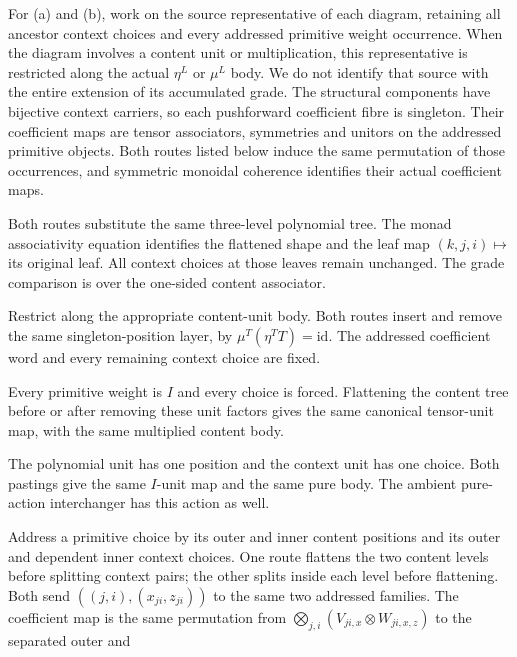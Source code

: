 \documentclass[11pt,a4paper]{article}
\theoremstyle{definition}
\newcommand{\id}{\mathrm{id}}
\begin{document}
For (a) and (b), work on the source representative of each diagram, retaining
all ancestor context choices and every addressed primitive weight occurrence.
When the diagram involves a content unit or multiplication, this representative
is restricted along the actual $\eta^L$ or $\mu^L$ body. We do not identify
that source with the entire extension of its accumulated grade. The structural
components have bijective context carriers, so each pushforward coefficient
fibre is singleton. Their coefficient maps are tensor associators, symmetries
and unitors on the addressed primitive objects. Both routes listed below
induce the same permutation of those occurrences, and symmetric monoidal
coherence identifies their actual coefficient maps.

\begin{description}[style=nextline]
\item[C1 content associativity on $NNNM$.]
Both routes substitute the same three-level polynomial tree. The monad
associativity equation identifies the flattened shape and the leaf map
$(k,j,i)\mapsto$ its original leaf. All context choices at those leaves remain
unchanged. The grade comparison is over the one-sided content associator.
\item[C2 content left unit.]
Restrict along the appropriate content-unit body. Both routes insert and
remove the same singleton-position layer, by $\mu^T(\eta^TT)=\id$.
The addressed coefficient word and every remaining context choice are fixed.
\item[C3 content multiplication against the context unit.]
Every primitive weight is $I$ and every choice is forced. Flattening the
content tree before or after removing these unit factors gives the same
canonical tensor-unit map, with the same multiplied content body.
\item[C4 both units.]
The polynomial unit has one position and the context unit has one choice.
Both pastings give the same $I$-unit map and the same pure body. The ambient
pure-action interchanger has this action as well.
\item[C5 both multiplications on $NNMM$.]
Address a primitive choice by its outer and inner content positions and its
outer and dependent inner context choices. One route flattens the two content
levels before splitting context pairs; the other splits inside each level
before flattening. Both send
$((j,i),(x_{ji},z_{ji}))$ to the same two addressed families. The coefficient
map is the same permutation from
$\bigotimes_{j,i}(V_{ji,x}\otimes W_{ji,x,z})$ to the separated outer and

\end{description}
\end{document}
